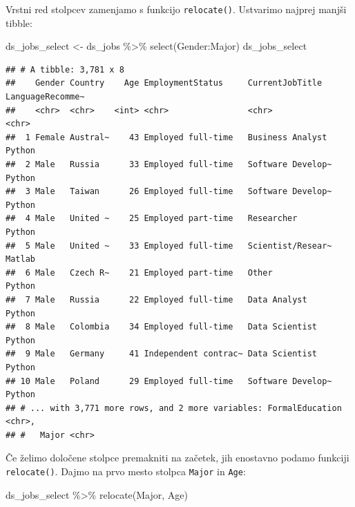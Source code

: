 \documentclass[
]{book}
\newenvironment{Shaded}{\begin{snugshade}}{\end{snugshade}}
\newcommand{\FunctionTok}[1]{\textcolor[rgb]{0.00,0.00,0.00}{#1}}
\newcommand{\NormalTok}[1]{#1}
\newcommand{\OtherTok}[1]{\textcolor[rgb]{0.56,0.35,0.01}{#1}}
\newcommand{\SpecialCharTok}[1]{\textcolor[rgb]{0.00,0.00,0.00}{#1}}
\begin{document}
Vrstni red stolpcev zamenjamo s funkcijo \texttt{relocate()}. Ustvarimo najprej manjši tibble:

\begin{Shaded}
\begin{Highlighting}[]
\NormalTok{ds\_jobs\_select }\OtherTok{\textless{}{-}}\NormalTok{ ds\_jobs }\SpecialCharTok{\%\textgreater{}\%}
  \FunctionTok{select}\NormalTok{(Gender}\SpecialCharTok{:}\NormalTok{Major)}
\NormalTok{ds\_jobs\_select}
\end{Highlighting}
\end{Shaded}

\begin{verbatim}
## # A tibble: 3,781 x 8
##    Gender Country    Age EmploymentStatus     CurrentJobTitle   LanguageRecomme~
##    <chr>  <chr>    <int> <chr>                <chr>             <chr>           
##  1 Female Austral~    43 Employed full-time   Business Analyst  Python          
##  2 Male   Russia      33 Employed full-time   Software Develop~ Python          
##  3 Male   Taiwan      26 Employed full-time   Software Develop~ Python          
##  4 Male   United ~    25 Employed part-time   Researcher        Python          
##  5 Male   United ~    33 Employed full-time   Scientist/Resear~ Matlab          
##  6 Male   Czech R~    21 Employed part-time   Other             Python          
##  7 Male   Russia      22 Employed full-time   Data Analyst      Python          
##  8 Male   Colombia    34 Employed full-time   Data Scientist    Python          
##  9 Male   Germany     41 Independent contrac~ Data Scientist    Python          
## 10 Male   Poland      29 Employed full-time   Software Develop~ Python          
## # ... with 3,771 more rows, and 2 more variables: FormalEducation <chr>,
## #   Major <chr>
\end{verbatim}

Če želimo določene stolpce premakniti na začetek, jih enostavno podamo funkciji \texttt{relocate()}. Dajmo na prvo mesto stolpca \texttt{Major} in \texttt{Age}:

\begin{Shaded}
\begin{Highlighting}[]
\NormalTok{ds\_jobs\_select }\SpecialCharTok{\%\textgreater{}\%}
  \FunctionTok{relocate}\NormalTok{(Major, Age)}
\end{Highlighting}
\end{Shaded}
\end{document}
